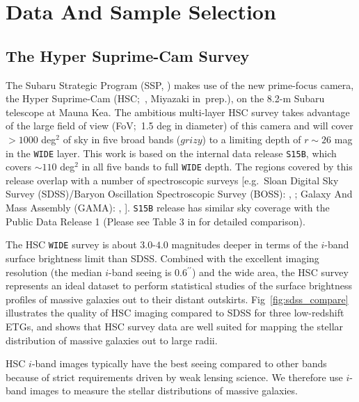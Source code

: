 \documentclass[fleqn,usenatbib]{mnras}
\def\asec{$^{\prime\prime}$}
\begin{document}
\section{Data And Sample Selection}
    \label{sec:data}

\subsection{The Hyper Suprime-Cam Survey}
    \label{ssec:hsc}

    The Subaru Strategic Program (SSP, \citealt{HSC-SSP, HSC-DR1}) makes use of the 
    new prime-focus camera, the Hyper Suprime-Cam (HSC;~\citealt{Miyazaki2012}, 
    Miyazaki in~prep.), on the 
    8.2-m Subaru telescope at Mauna Kea. 
    The ambitious multi-layer HSC survey takes advantage of the large field of 
    view (FoV;~1.5 deg in diameter) of this camera and will cover $>1000$ deg$^2$ 
    of sky in five broad bands ($grizy$) to a limiting depth of $r {\sim} 26$ mag 
    in the \texttt{WIDE} layer. 
    This work is based on the internal data release \texttt{S15B}, which covers 
    ${\sim} 110$ deg$^2$ in all five bands to full \texttt{WIDE} depth.  
    The regions covered by this release overlap with a number of spectroscopic 
    surveys 
    [e.g.\ Sloan Digital Sky Survey (SDSS)/Baryon Oscillation Spectroscopic Survey 
    (BOSS): \citealt{Eisenstein2011}, \citealt{SDSS-DR12}; 
    Galaxy And Mass Assembly (GAMA): \citealt{Driver2011}, \citealt{Liske2015}].
    \texttt{S15B} release has similar sky coverage with the Public Data Release 1
    (Please see Table 3 in \citealt{HSC-DR1} for detailed comparison).

    The HSC \texttt{WIDE} survey is about $3.0$-$4.0$ magnitudes deeper in terms of 
    the $i$-band surface brightness limit than SDSS. 
    Combined with the excellent imaging resolution (the median $i$-band seeing is 
    0.6\asec) and the wide area, the HSC survey represents an ideal dataset to perform 
    statistical studies of the surface brightness profiles of massive galaxies out to 
    their distant outskirts.  
    Fig~\ref{fig:sdss_compare} illustrates the quality of HSC imaging compared to SDSS 
    for three low-redshift ETGs, and shows that HSC survey data are well suited for 
    mapping the stellar distribution of massive galaxies out to large radii.

	HSC $i$-band images typically have the best seeing compared to other bands because 
	of strict requirements driven by weak lensing science. 
    We therefore use $i$-band images to measure the stellar distributions of 
    massive galaxies.
    
\end{document}
